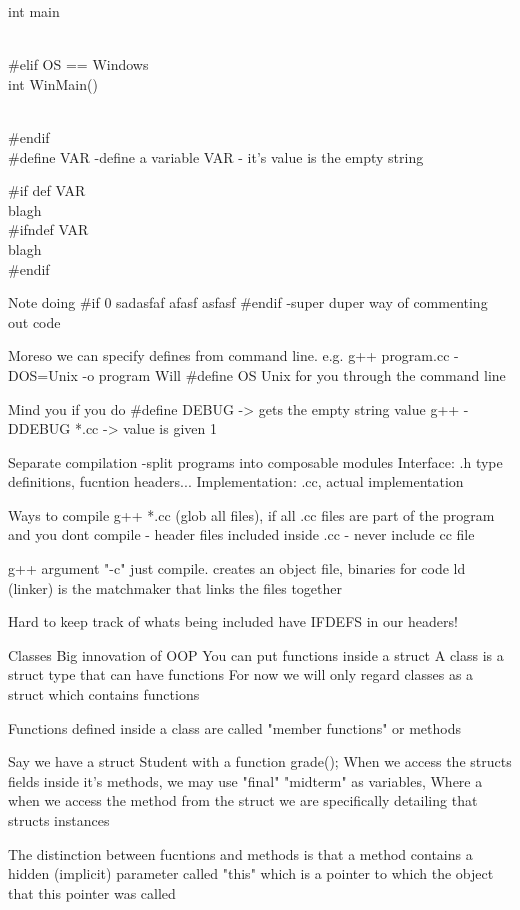 \documentclass[12pt,oneside,fleqn]{book}
\begin{document}
int main { \\
\#elif OS == Windows \\
int WinMain() { \\
\#endif \\


\#define VAR
-define a variable VAR
- it's value is the empty string

\#if def VAR \\
blagh \\
\#ifndef VAR \\
blagh \\
\#endif


Note
doing
\#if 0
sadasfaf
afasf
asfasf
\#endif
-super duper way of commenting out code


Moreso we can specify defines from command line.
e.g.
g++ program.cc -DOS=Unix -o program
Will \#define OS Unix for you through the command line

Mind you if you do 
\#define DEBUG -> gets the empty string value
g++ -DDEBUG *.cc -> value is given 1

Separate compilation
-split programs into composable modules
Interface: .h type definitions, fucntion headers...
Implementation: .cc, actual implementation

Ways to compile
g++ *.cc (glob all files), if all .cc files are part of the program and you dont compile - header files included inside .cc
- never include cc file

g++ argument "-c" just compile. creates an object file, binaries for code
ld (linker) is the matchmaker that links the files together


Hard to keep track of whats being included
have IFDEFS in our headers!


Classes
Big innovation of OOP
You can put functions inside a struct 
A class is a struct type that can have functions
For now we will only regard classes as a struct which contains functions

Functions defined inside a class are called "member functions" or methods

Say we have a struct Student with a function grade();
When we access the structs fields inside it's methods, we may use "final" "midterm" as variables,
Where a when we access the method from the struct we are specifically detailing that structs instances

The distinction between fucntions and methods is that a method contains a hidden (implicit) parameter called "this" which is a pointer to which the object that this pointer was called


}}
\end{document}

